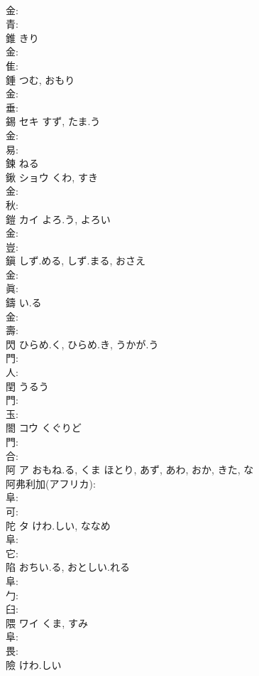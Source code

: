 \documentclass[8pt]{extreport}
\begin{document}
\begin{CJK}{UTF8}{min}
\\	金: 
\\	青: 
\\	錐		きり				
\\	金: 
\\	隹: 
\\	錘		つむ, おもり				
\\	金: 
\\	垂: 
\\	錫	セキ	すず, たま.う		
\\	金: 
\\	易: 
\\	鍊		ねる				
\\	鍬	ショウ	くわ, すき		
\\	金: 
\\	秋: 
\\	鎧	カイ	よろ.う, よろい		
\\	金: 
\\	豈: 
\\	鎭		しず.める, しず.まる, おさえ				
\\	金: 
\\	眞: 
\\	鑄		い.る				
\\	金: 
\\	壽: 
\\	閃		ひらめ.く, ひらめ.き, うかが.う				
\\	門: 
\\	人: 
\\	閏		うるう				
\\	門: 
\\	玉: 
\\	閤	コウ	くぐりど		
\\	門: 
\\	合: 
\\	阿	ア	おもね.る, くま	ほとり, あず, あわ, おか, きた, な	
\\	阿弗利加(アフリカ): 
\\	阜: 
\\	可: 
\\	陀	タ	けわ.しい, ななめ		
\\	阜: 
\\	它: 
\\	陷		おちい.る, おとしい.れる				
\\	阜: 
\\	勹: 
\\	臼: 
\\	隈	ワイ	くま, すみ		
\\	阜: 
\\	畏: 
\\	險		けわ.しい				

\end{CJK}
\end{document}

